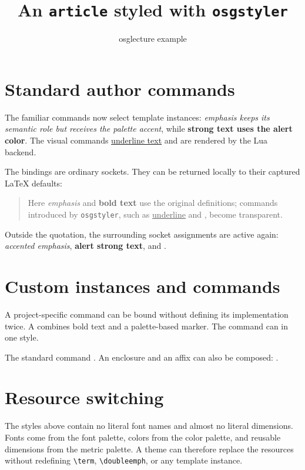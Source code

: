 \documentclass{article}
\title{An \texttt{article} styled with \texttt{osgstyler}}
\author{osglecture example}
\date{}
\begin{document}
\maketitle

\section{Standard author commands}

The familiar commands now select template instances: \emph{emphasis keeps its
semantic role but receives the palette accent}, while \textbf{strong text uses
the alert color}. The visual commands \uline{underline text} and
 are rendered by the Lua backend.

The bindings are ordinary sockets. They can be returned locally to their
captured LaTeX defaults:

\begin{quote}
  \UseOsgDefaultInlineCommands
  Here \emph{emphasis} and \textbf{bold text} use the original definitions;
  commands introduced by \texttt{osgstyler}, such as
  \uline{underline} and , become transparent.
\end{quote}

Outside the quotation, the surrounding socket assignments are active again:
\emph{accented emphasis}, \textbf{alert strong text}, and
.

\section{Custom instances and commands}

A project-specific command can be bound without defining its implementation
twice. A  combines bold text and a palette-based marker.
The command can  in one style.

The standard command . An enclosure
and an affix can also be composed:
.

\section{Resource switching}

The styles above contain no literal font names and almost no literal
dimensions. Fonts come from the font palette, colors from the color palette,
and reusable dimensions from the metric palette. A theme can therefore replace
the resources without redefining \verb|\term|, \verb|\doubleemph|, or any
template instance.
\end{document}
